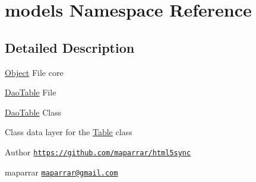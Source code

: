 \hypertarget{namespacemodels}{\section{models Namespace Reference}
\label{namespacemodels}
}


\subsection{Detailed Description}
\hyperlink{classObject}{Object} File  core

\hyperlink{classDaoTable}{Dao\-Table} File

\hyperlink{classDaoTable}{Dao\-Table} Class

Class data layer for the \hyperlink{classTable}{Table} class

\begin{DoxyAuthor}{Author}
\href{https://github.com/maparrar/html5sync}{\tt https\-://github.\-com/maparrar/html5sync} 

maparrar \href{mailto:maparrar@gmail.com}{\tt maparrar@gmail.\-com} 
\end{DoxyAuthor}

